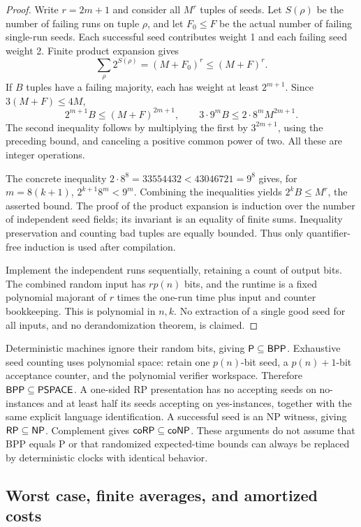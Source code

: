 \begin{proof}
Write \(r=2m+1\) and consider all \(M^r\) tuples of seeds. Let \(S(\rho)\)
be the number of failing runs on tuple \(\rho\), and let \(F_0\le F\)
be the actual number of failing single-run seeds. Each successful seed
contributes weight 1 and each failing seed weight 2. Finite product
expansion gives
\[
 \sum_{\rho}2^{S(\rho)}=(M+F_0)^r\le(M+F)^r.
\]
If \(B\) tuples have a failing majority, each has weight at least
\(2^{m+1}\). Since \(3(M+F)\le4M\),
\[
 2^{m+1}B\le(M+F)^{2m+1},\qquad
 3\cdot9^m B\le2\cdot8^m M^{2m+1}.
\]
The second inequality follows by multiplying the first by
\(3^{2m+1}\), using the preceding bound, and canceling a positive common
power of two. All these are integer operations.

The concrete inequality \(2\cdot8^8=33554432<43046721=9^8\) gives, for
\(m=8(k+1)\),
\(2^{k+1}8^m<9^m\). Combining the inequalities yields
\(2^kB\le M^r\), the asserted bound. The proof of the product expansion
is induction over the number of independent seed fields; its invariant is
an equality of finite sums. Inequality preservation and counting bad
tuples are equally bounded. Thus only quantifier-free induction is used
after compilation.

Implement the independent runs sequentially, retaining a count of output
bits. The combined random input has \(r p(n)\) bits, and the runtime is
a fixed polynomial majorant of \(r\) times the one-run time plus input
and counter bookkeeping. This is polynomial in \(n,k\). No extraction of
a single good seed for all inputs, and no derandomization theorem, is
claimed.
\end{proof}

Deterministic machines ignore their random bits, giving
\(\mathsf P\subseteq\mathsf{BPP}\). Exhaustive seed counting uses polynomial
space: retain one \(p(n)\)-bit seed, a \(p(n)+1\)-bit acceptance counter,
and the polynomial verifier workspace. Therefore
\(\mathsf{BPP}\subseteq\mathsf{PSPACE}\). A one-sided RP presentation has no
accepting seeds on no-instances and at least half its seeds accepting on
yes-instances, together with the same explicit language identification.
A successful seed is an NP witness, giving \(\mathsf{RP}\subseteq\mathsf{NP}\).
Complement gives \(\mathsf{coRP}\subseteq\mathsf{coNP}\). These arguments do not
assume that BPP equals P or that randomized expected-time bounds can always
be replaced by deterministic clocks with identical behavior.

\subsection{Worst case, finite averages, and amortized costs}

